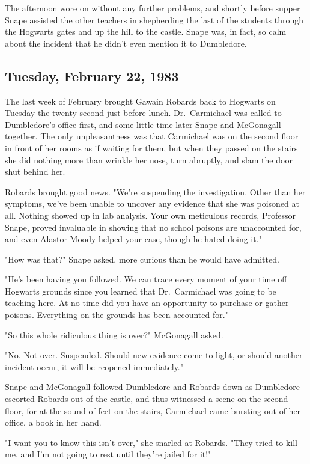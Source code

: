 The afternoon wore on without any further problems, and shortly before supper Snape assisted the other teachers in shepherding the last of the students through the Hogwarts gates and up the hill to the castle. Snape was, in fact, so calm about the incident that he didn't even mention it to Dumbledore.

\subsection{Tuesday, February 22, 1983}

The last week of February brought Gawain Robards back to Hogwarts on Tuesday the twenty-second just before lunch. Dr.~Carmichael was called to Dumbledore's office first, and some little time later Snape and McGonagall together. The only unpleasantness was that Carmichael was on the second floor in front of her rooms as if waiting for them, but when they passed on the stairs she did nothing more than wrinkle her nose, turn abruptly, and slam the door shut behind her.

Robards brought good news. "We're suspending the investigation. Other than her symptoms, we've been unable to uncover any evidence that she was poisoned at all. Nothing showed up in lab analysis. Your own meticulous records, Professor Snape, proved invaluable in showing that no school poisons are unaccounted for, and even Alastor Moody helped your case, though he hated doing it."

"How was that?" Snape asked, more curious than he would have admitted.

"He's been having you followed. We can trace every moment of your time off Hogwarts grounds since you learned that Dr.~Carmichael was going to be teaching here. At no time did you have an opportunity to purchase or gather poisons. Everything on the grounds has been accounted for."

"So this whole ridiculous thing is over?" McGonagall asked.

"No. Not over. Suspended. Should new evidence come to light, or should another incident occur, it will be reopened immediately."

Snape and McGonagall followed Dumbledore and Robards down as Dumbledore escorted Robards out of the castle, and thus witnessed a scene on the second floor, for at the sound of feet on the stairs, Carmichael came bursting out of her office, a book in her hand.

"I want you to know this isn't over," she snarled at Robards. "They tried to kill me, and I'm not going to rest until they're jailed for it!"

